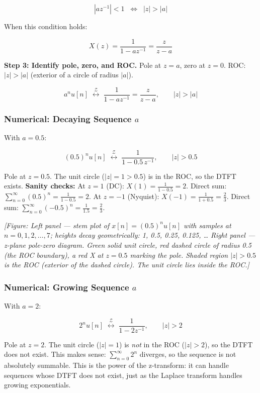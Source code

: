 \documentclass[11pt]{article}
\begin{document}
\[|az^{-1}| < 1 \;\;\Longleftrightarrow\;\; |z| > |a|\]

When this condition holds:

\[X(z) = \frac{1}{1 - az^{-1}} = \frac{z}{z-a}\]

\textbf{Step 3: Identify pole, zero, and ROC.}
Pole at $z = a$, zero at $z = 0$. ROC: $|z| > |a|$ (exterior of a circle of radius $|a|$).

\[\boxed{a^n u[n] \;\overset{\mathcal{Z}}{\longleftrightarrow}\; \frac{1}{1 - az^{-1}} = \frac{z}{z-a}, \qquad |z| > |a|}\]

\subsubsection*{Numerical: Decaying Sequence $a$}

With $a = 0.5$:

\[(0.5)^n u[n] \;\overset{\mathcal{Z}}{\longleftrightarrow}\; \frac{1}{1 - 0.5\, z^{-1}}, \qquad |z| > 0.5\]

Pole at $z = 0.5$. The unit circle ($|z| = 1 > 0.5$) is in the ROC, so the DTFT exists.
\textbf{Sanity checks:}
At $z = 1$ (DC): $X(1) = \frac{1}{1 - 0.5} = 2$. Direct sum: $\sum_{n=0}^{\infty} (0.5)^n = \frac{1}{1 - 0.5} = 2$. \checkmark
At $z = -1$ (Nyquist): $X(-1) = \frac{1}{1 + 0.5} = \frac{2}{3}$. Direct sum: $\sum_{n=0}^{\infty} (-0.5)^n = \frac{1}{1.5} = \frac{2}{3}$. \checkmark

\textit{[Figure: Left panel — stem plot of $x[n] = (0.5)^n u[n]$ with samples at $n = 0, 1, 2, \ldots, 7$; heights decay geometrically: 1, 0.5, 0.25, 0.125, … Right panel — z-plane pole-zero diagram. Green solid unit circle, red dashed circle of radius 0.5 (the ROC boundary), a red X at $z = 0.5$ marking the pole. Shaded region $|z| > 0.5$ is the ROC (exterior of the dashed circle). The unit circle lies inside the ROC.]}

\subsubsection*{Numerical: Growing Sequence $a$}

With $a = 2$:

\[2^n u[n] \;\overset{\mathcal{Z}}{\longleftrightarrow}\; \frac{1}{1 - 2z^{-1}}, \qquad |z| > 2\]

Pole at $z = 2$. The unit circle ($|z| = 1$) is \textit{not} in the ROC ($|z| > 2$), so the DTFT does not exist. This makes sense: $\sum_{n=0}^{\infty} 2^n$ diverges, so the sequence is not absolutely summable. This is the power of the z-transform: it can handle sequences whose DTFT does not exist, just as the Laplace transform handles growing exponentials.
\end{document}

